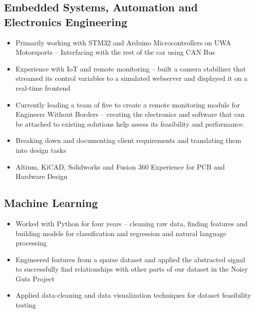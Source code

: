 \documentclass[a4page]{article}
\begin{document}
    \begin{multicols}{2}
        \subsection{Embedded Systems, Automation and Electronics Engineering}
    \begin{itemize}
        \item Primarily working with STM32 and Arduino Microcontrollers on UWA Motorsports – Interfacing with the rest of the car using CAN Bus
        \item Experience with IoT and remote monitoring – built a camera stabilizer that streamed its control variables to a simulated webserver and displayed it on a real-time frontend
        \item Currently leading a team of five to create a remote monitoring module for Engineers Without Borders – creating the electronics and software that can be attached to existing solutions help assess its feasibility and performance.
        \item Breaking down and documenting client requirements and translating them into design tasks
        \item Altium, KiCAD, Solidworks and Fusion 360 Experience for PCB and Hardware Design
    \end{itemize}

    \subsection{Machine Learning}
    \begin{itemize}
        \item Worked with Python for four years – cleaning raw data, finding features and building models for classification and regression and natural language processing
        \item Engineered features from a sparse dataset and applied the abstracted signal to successfully find relationships with other parts of our dataset in the Noisy Guts Project
        \item Applied data-cleaning and data visualization techniques for dataset feasibility testing
    \end{itemize}
    

\end{multicols}
\end{document}
